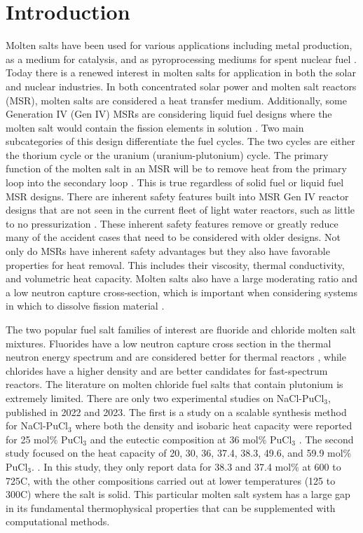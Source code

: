 \documentclass[review]{elsarticle}
\begin{document}

\section{Introduction}
Molten salts have been used for various applications including metal production\cite{Zhu2014, VAHIDI2018178}, as a medium for catalysis\cite{JIN20202382, HU20204244}, and as pyroprocessing mediums for spent nuclear fuel \cite{CHOI2015572, osti_22107867}. Today there is a renewed interest in molten salts for application in both the solar and nuclear industries. In both concentrated solar power and molten salt reactors (MSR), molten salts are considered a heat transfer medium. Additionally, some Generation IV (Gen IV) MSRs are considering liquid fuel designs where the molten salt would contain the fission elements in solution \cite{doi:10.1080/00295450.2019.1586372}. Two main subcategories of this design differentiate the fuel cycles. The two cycles are either the thorium cycle or the uranium (uranium-plutonium) cycle. The primary function of the molten salt in an MSR will be to remove heat from the primary loop into the secondary loop \cite{gakhar2021molten}. This is true regardless of solid fuel or liquid fuel MSR designs. There are inherent safety features built into MSR Gen IV reactor designs that are not seen in the current fleet of light water reactors, such as little to no pressurization \cite{leblanc2017integral}. These inherent safety features remove or greatly reduce many of the accident cases that need to be considered with older designs. Not only do MSRs have inherent safety advantages but they also have favorable properties for heat removal. This includes their viscosity, thermal conductivity, and volumetric heat capacity. Molten salts also have a large moderating ratio and a low neutron capture cross-section, which is important when considering systems in which to dissolve fission material \cite{williams2006assessment}.

The two popular fuel salt families of interest are fluoride and chloride molten salt mixtures. Fluorides have a low neutron capture cross section in the thermal neutron energy spectrum and are considered better for thermal reactors \cite{williams2006assessment}, while chlorides have a higher density and are better candidates for fast-spectrum reactors. The literature on molten chloride fuel salts that contain plutonium is extremely limited. There are only two experimental studies on NaCl-PuCl$_3$, published in 2022 and 2023. The first is a study on a scalable synthesis method for NaCl-PuCl$_3$ where both the density and isobaric heat capacity were reported for 25 mol\% PuCl$_3$ and the eutectic composition at 36 mol\% PuCl$_3$ \cite{karlsson2022synthesis}. The second study focused on the heat capacity of 20, 30, 36, 37.4, 38.3, 49.6, and 59.9 mol\% PuCl$_3$. \cite{lichtenstein2022property}. In this study, they only report data for 38.3 and 37.4 mol\% at 600 to 725\degree C, with the other compositions carried out at lower temperatures (125 to 300\degree C) where the salt is solid. This particular molten salt system has a large gap in its fundamental thermophysical properties that can be supplemented with computational methods.
\end{document}
